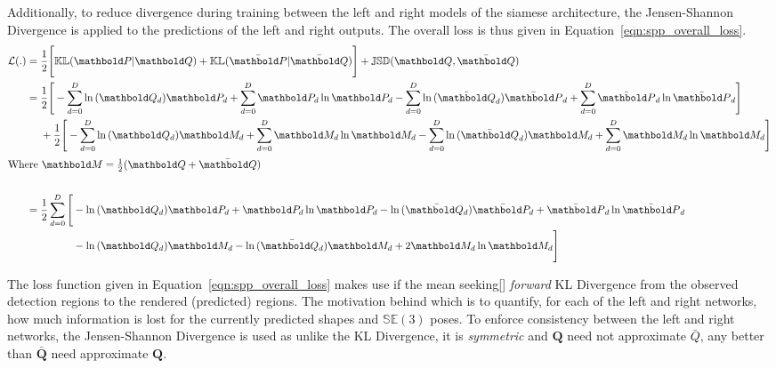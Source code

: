 Additionally, to reduce divergence during training between the left and right models of the siamese 
architecture, the Jensen-Shannon Divergence is applied to the predictions of the left and right outputs.
The overall loss is thus given in Equation~\ref{eqn:spp_overall_loss}.
\begin{align}
  \label{eqn:spp_overall_loss}
  \mathcal{L}(.) &{}= \frac{1}{2} \Bigg[
    \mathbb{KL}(\bm{P} \vert \bm{Q}) + \mathbb{KL}(\bar{\bm{P}} \vert \bar{\bm{Q}})
  \Bigg]
  + \mathbb{JSD}(\bm{Q}, \bar{\bm{Q}})\\
  &{}= 
  \begin{aligned}[t]
    {}& \frac{1}{2} \Bigg[
      -\sum_{d = 0}^{D} \ln{(\bm{Q}_{d})}\bm{P}_{d} + \sum_{d = 0}^{D} \bm{P}_{d}\ln{\bm{P}_{d}}
      -\sum_{d = 0}^{D} \ln{(\bar{\bm{Q}}_{d})}\bar{\bm{P}}_{d} + \sum_{d = 0}^{D} \bar{\bm{P}}_{d}\ln{\bar{\bm{P}}_{d}}
    \Bigg]\\
    {}& + \frac{1}{2} \Bigg[
      -\sum_{d = 0}^{D} \ln{(\bm{Q}_{d})}\bm{M}_{d} + \sum_{d = 0}^{D} \bm{M}_{d}\ln{\bm{M}_{d}}
      -\sum_{d = 0}^{D} \ln{(\bar{\bm{Q}}_{d})}\bm{M}_{d} + \sum_{d = 0}^{D} \bm{M}_{d}\ln{\bm{M}_{d}}
    \Bigg]
  \end{aligned}\\
  \shortintertext{Where \( \bm{M} = \frac{1}{2} (\bm{Q} + \bar{\bm{Q}}) \)}\\
  {}&= \frac{1}{2} \sum_{d = 0}^{D}
    \begin{aligned}[t]
    \Bigg[ {}&
    -\ln{(\bm{Q}_{d})}\bm{P}_{d} + \bm{P}_{d}\ln{\bm{P}_{d}}
    -\ln{(\bar{\bm{Q}_{d}})}\bar{\bm{P}_{d}} + \bar{\bm{P}}_{d}\ln{\bar{\bm{P}}_{d}}\\
    {}& -\ln{(\bm{Q}_{d})}\bm{M}_{d} -\ln{(\bar{\bm{Q}_{d}})}\bm{M}_{d} + 2\bm{M}_{d}\ln{\bm{M}_{d}}
    \Bigg]
    \end{aligned}
\end{align}

The loss function given in Equation~\ref{eqn:spp_overall_loss} makes use if the mean seeking\ref{} 
\textit{forward} KL Divergence from the observed detection regions to the rendered (predicted) 
regions. The motivation behind which is to quantify, for each of the left and right networks, how 
much information is lost for the currently predicted shapes and \( \mathbb{SE}(3) \) poses. To 
enforce consistency between the left and right networks, the Jensen-Shannon Divergence is used as 
unlike the KL Divergence, it is \textit{symmetric} and \( \bm{Q} \) need not approximate \( \bar{Q} \), 
any better than \( \bar{\bm{Q}} \) need approximate \( \bm{Q} \).

